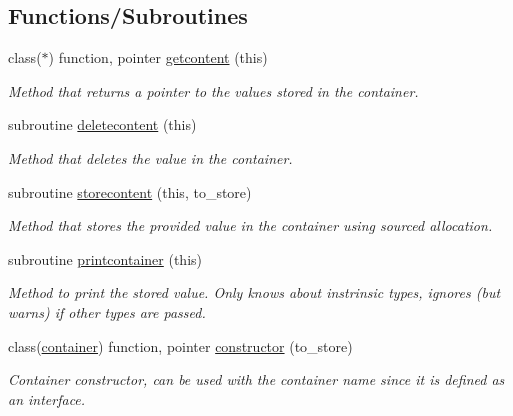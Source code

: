 \subsection*{Functions/\+Subroutines}
\begin{DoxyCompactItemize}
\item 
class($\ast$) function, pointer \mbox{\hyperlink{namespacecontainer__mod_a23a016e747d896622127c0c21dca9836}{getcontent}} (this)
\begin{DoxyCompactList}\small\item\em Method that returns a pointer to the values stored in the container. \end{DoxyCompactList}\item 
subroutine \mbox{\hyperlink{namespacecontainer__mod_a005e6cba51f5837a8bef1f05bb899c08}{deletecontent}} (this)
\begin{DoxyCompactList}\small\item\em Method that deletes the value in the container. \end{DoxyCompactList}\item 
subroutine \mbox{\hyperlink{namespacecontainer__mod_ace49cee012b6cd3c41c03556ab0dd884}{storecontent}} (this, to\+\_\+store)
\begin{DoxyCompactList}\small\item\em Method that stores the provided value in the container using sourced allocation. \end{DoxyCompactList}\item 
subroutine \mbox{\hyperlink{namespacecontainer__mod_abf1785185971a527e437d3a489462724}{printcontainer}} (this)
\begin{DoxyCompactList}\small\item\em Method to print the stored value. Only knows about instrinsic types, ignores (but warns) if other types are passed. \end{DoxyCompactList}\item 
class(\mbox{\hyperlink{structcontainer__mod_1_1container}{container}}) function, pointer \mbox{\hyperlink{namespacecontainer__mod_a6262df4ff34024d566cf8261dc20a248}{constructor}} (to\+\_\+store)
\begin{DoxyCompactList}\small\item\em Container constructor, can be used with the \textquotesingle{}container\textquotesingle{} name since it is defined as an interface. \end{DoxyCompactList}\end{DoxyCompactItemize}


